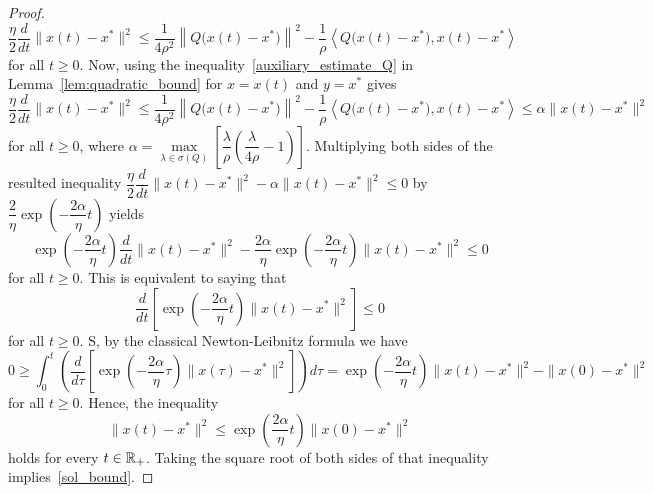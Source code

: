 \documentclass[11pt]{article}
\theoremstyle{definition}
\theoremstyle{remark}
\def\R{\Bbb R}
\begin{document}
\begin{proof}
\begin{equation*}
	\dfrac{\eta}{2}\dfrac{d}{dt}\|x(t)-x^*\|^2 \leq\dfrac{1}{4\rho^2}\left\|Q\big(x(t)-x^*\big)\right\|^2  -\dfrac{1}{\rho}\left\langle Q\big(x(t)-x^*\big), x(t)-x^*\right\rangle
\end{equation*}
for all $t\geq 0$. Now, using the inequality~\eqref{auxiliary_estimate_Q} in 
 Lemma~\ref{lem:quadratic_bound} for $x=x(t)$ and $y=x^*$ gives
 \begin{equation*}
 	\dfrac{\eta}{2}\dfrac{d}{dt}\|x(t)-x^*\|^2 \leq\dfrac{1}{4\rho^2}\left\|Q\big(x(t)-x^*\big)\right\|^2  -\dfrac{1}{\rho}\left\langle Q\big(x(t)-x^*\big), x(t)-x^*\right\rangle\leq \alpha \|x(t) - x^*\|^2
 \end{equation*}
 for all $t \geq 0$, where $\alpha = \max\limits_{\lambda \in \sigma(Q)} \left[ \dfrac{\lambda}{\rho} \left( \dfrac{\lambda}{4\rho} - 1 \right)\right]$. Multiplying both sides of the resulted inequality $\dfrac{\eta}{2}\dfrac{d}{dt}\|x(t)-x^*\|^2 -\alpha \|x(t) - x^*\|^2\leq 0$ by $\dfrac{2}{\eta}\exp\left(-\dfrac{2\alpha}{\eta}t\right)$ yields
 $$\exp\left(-\frac{2\alpha}{\eta}t\right)\dfrac{d}{dt}\|x(t)-x^*\|^2-\frac{2\alpha }{\eta}\exp\left(-\frac{2\alpha}{\eta}t\right)\|x(t) - x^*\|^2\leq 0$$
 for all $t\geq 0$. This is equivalent to saying that
 $$\dfrac{d}{dt}\left[\exp\left(-\frac{2\alpha}{\eta}t\right)\|x(t)-x^*\|^2\right]\leq 0$$ for all $t\geq 0$. S, by the classical Newton-Leibnitz formula we have 
 $$0\geq\int_0^t  \left(\dfrac{d}{d\tau}\left[\exp\left(-\frac{2\alpha}{\eta}\tau\right)\|x(\tau)-x^*\|^2\right]\right)d\tau= \exp\left(-\frac{2\alpha}{\eta}t\right)\|x(t)-x^*\|^2-\|x(0)-x^*\|^2$$ for all $t\geq 0$. Hence, the inequality
$$\|x(t)-x^*\|^2\leq \exp\left(\frac{2\alpha}{\eta}t\right)\|x(0)-x^*\|^2$$ holds for every $t\in\R_+$.
Taking the square root of both sides of that inequality implies~\eqref{sol_bound}.
\end{proof}
\end{document}
